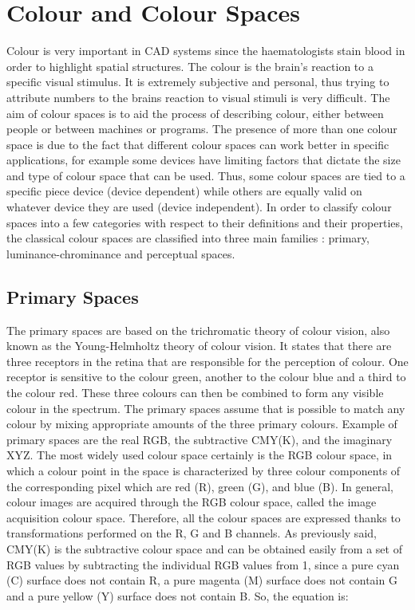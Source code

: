 \documentclass[final,a4paper,12pt,english]{UnicaPhdThesis3}
\begin{document}
\section{Colour and Colour Spaces} 
Colour is very important in CAD systems since the haematologists stain blood in order to highlight spatial structures. The colour is the brain's reaction to a specific visual stimulus. It is  extremely subjective and personal, thus trying to attribute numbers to the brains reaction to visual stimuli is very difficult. The aim of colour spaces is to aid the process of describing colour, either between people or between machines or programs. The presence of more than one colour space is due to the fact that different colour spaces can work better in specific applications, for example some devices have limiting factors that dictate the size and type of colour space that can be used. Thus, some colour spaces are tied to a specific piece device (device dependent) while others are equally valid on whatever device they are used (device independent). In order to classify colour spaces into a few categories with respect to their definitions and their properties, the classical colour spaces are classified into three main families \cite{Vandenbroucke, Busin}: primary, luminance-chrominance and perceptual spaces.

\subsection{Primary Spaces}  
The primary spaces are based on the trichromatic theory of colour vision, also known as the Young-Helmholtz theory of colour vision. It states that there are three receptors in the retina that are responsible for the perception of colour. One receptor is sensitive to the colour green, another to the colour blue and a third to the colour red. These three colours can then be combined to form any visible colour in the spectrum.
The primary spaces assume that is possible to match any colour by mixing appropriate amounts of the three primary colours. Example of primary spaces are the real RGB, the subtractive CMY(K), and the imaginary XYZ. The most widely used colour space certainly is the RGB colour space, in which a colour point in the space is characterized by three colour components of the corresponding pixel which are red (R), green (G), and blue (B). In general, colour images are acquired through the RGB colour space, called the image acquisition colour space. Therefore, all the colour spaces are expressed thanks to transformations performed on the R, G and B channels.
As previously said, CMY(K) is the subtractive colour space and can be obtained easily from a set of RGB values by subtracting the individual RGB values from 1, since a pure cyan (C) surface does not contain R, a pure magenta (M) surface does not contain G and a pure yellow (Y) surface does not contain B. So, the equation is:
 
\end{document}
